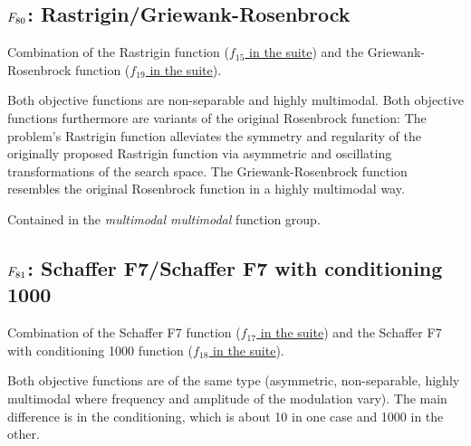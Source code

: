 \subsection[\texorpdfstring{\protect\(F_{80}\protect\): Rastrigin/Griewank-Rosenbrock}{F80: Rastrigin/Griewank-Rosenbrock}]{\texorpdfstring{\protect\(F_{80}\protect\): Rastrigin/Griewank-Rosenbrock}{}}
\label{index:rastrigin-griewank-rosenbrock}\label{index:f80}
Combination of the Rastrigin function (\href{https://coco.gforge.inria.fr/downloads/download16.00/bbobdocfunctions.pdf\#page=75}{\(f_{15}\) in the \bbob suite}) and the
Griewank-Rosenbrock function (\href{https://coco.gforge.inria.fr/downloads/download16.00/bbobdocfunctions.pdf\#page=95}{\(f_{19}\) in the \bbob suite}).

Both objective functions are non-separable and highly multimodal.
Both objective functions furthermore are variants of the original Rosenbrock
function:
The problem's Rastrigin function alleviates the symmetry and regularity of
the originally proposed Rastrigin function via asymmetric and oscillating
transformations of the search space. The Griewank-Rosenbrock function
resembles the original Rosenbrock function in a highly multimodal way.

Contained in the \emph{multimodal multimodal} function group.



\subsection[\texorpdfstring{\protect\(F_{81}\protect\): Schaffer F7/Schaffer F7 with conditioning 1000}{F81: Schaffer F7/Schaffer F7 with conditioning 1000}]{\texorpdfstring{\protect\(F_{81}\protect\): Schaffer F7/Schaffer F7 with conditioning 1000}{}}
\label{index:schaffer-f7-schaffer-f7-with-conditioning-1000}\label{index:f81}
Combination of the Schaffer F7 function (\href{https://coco.gforge.inria.fr/downloads/download16.00/bbobdocfunctions.pdf\#page=85}{\(f_{17}\) in the \bbob suite}) and the
Schaffer F7 with conditioning 1000 function (\href{https://coco.gforge.inria.fr/downloads/download16.00/bbobdocfunctions.pdf\#page=90}{\(f_{18}\) in the \bbob suite}).

Both objective functions are of the same type (asymmetric, non-separable,
highly multimodal where frequency and amplitude of the modulation vary).
The main difference is in the conditioning, which is about 10 in one case
and 1000 in the other.

